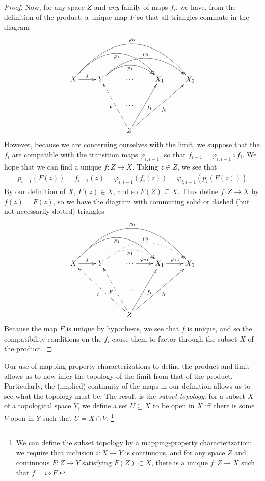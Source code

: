 \begin{claim}
\begin{proof}
          Now, for any space $Z$ and \emph{any} family of maps $f_i$, we have, from the definition of the product, a unique map $F$ so that all triangles commute in the diagram
          \begin{displaymath}
            \xymatrix{
              X \ar[r]^j \ar@/^37pt/[rrr]_{\varphi_1} \ar@/^50pt/[rrrr]^{\varphi_0}
              & Y \ar@/^20pt/[rr]_{p_1} \ar@/^30pt/[rrr]^{p_0}
              & \cdots
              & X_1
              & X_0
              \\ && \cdots \\
              && Z \ar@{-->}[uul]^F \ar[uur]_{f_1} \ar[uurr]_{f_0}
            }
          \end{displaymath}
          However, because we are concerning ourselves with the limit, we suppose that the $f_i$ are compatible with the transition maps $\varphi_{i,i-1}$, so that $f_{i-1} = \varphi_{i,i-1}\circ f_i$.
          We hope that we can find a unique $f:Z\rightarrow X$.
          Taking $z\in Z$, we see that
          \begin{align*}
            p_{i-1}(F(z)) = f_{i-1}(z) = \varphi_{i,i-1}(f_i(z)) = \varphi_{i,i-1}(p_i(F(z)))
          \end{align*}
          By our definition of $X$, $F(z)\in X$, and so $F(Z)\subseteq X$.
          Thus define $f:Z\rightarrow X$ by $f(z) = F(z)$, so we have the diagram with commuting solid or dashed (but not necessarily dotted) triangles
          \begin{displaymath}
            \xymatrix{
              X \ar[r]^j \ar@/^37pt/[rrr]_{\varphi_1} \ar@/^50pt/[rrrr]^{\varphi_0}
              & Y \ar@/^20pt/@{..>}[rr]_{p_1} \ar@/^30pt/@{..>}[rrr]^{p_0}
              & \cdots \ar[r]^{\varphi_{21}}
              & X_1 \ar[r]^{\varphi_{10}}
              & X_0
              \\ && \cdots \\
              && Z \ar@{-->}[uull]^f \ar@{-->}[uul]^F \ar[uur]_{f_1} \ar[uurr]_{f_0}
            }
          \end{displaymath}
          Because the map $F$ is unique by hypothesis, we see that $f$ is unique, and so the compatibility conditions on the $f_i$ cause them to factor through the subset $X$ of the product.
        \end{proof}
      \end{claim}

      Our use of mapping-property characterizations to define the product and limit allows us to now infer the topology of the limit from that of the product.
      Particularly, the (implied) continuity of the maps in our definition allows us to see what the topology must be.
      The result is the \emph{subset topology}: for a subset $X$ of a topological space $Y$, we define a set $U\subseteq X$ to be open in $X$ iff there is some $V$ open in $Y$ such that $U=X\cap V$.%
      \footnote{We can define the subset topology by a mapping-property characterization: we require that inclusion $i:X\rightarrow Y$ is continuous, and for any space $Z$ and continuous $F:Z\rightarrow Y$ satisfying $F(Z)\subset X$, there is a unique $f:Z\rightarrow X$ such that $f=i\circ F$.}

